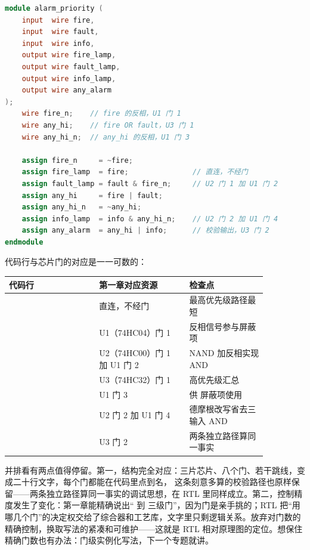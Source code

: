 \begin{lstlisting}[language=Verilog]
module alarm_priority (
    input  wire fire,
    input  wire fault,
    input  wire info,
    output wire fire_lamp,
    output wire fault_lamp,
    output wire info_lamp,
    output wire any_alarm
);
    wire fire_n;    // fire 的反相，U1 门 1
    wire any_hi;    // fire OR fault，U3 门 1
    wire any_hi_n;  // any_hi 的反相，U1 门 3

    assign fire_n     = ~fire;
    assign fire_lamp  = fire;               // 直连，不经门
    assign fault_lamp = fault & fire_n;     // U2 门 1 加 U1 门 2
    assign any_hi     = fire | fault;
    assign any_hi_n   = ~any_hi;
    assign info_lamp  = info & any_hi_n;    // U2 门 2 加 U1 门 4
    assign any_alarm  = any_hi | info;      // 校验输出，U3 门 2
endmodule
\end{lstlisting}

代码行与芯片门的对应是一一可数的：

\begin{longtable}{L{0.3\linewidth}L{0.3\linewidth}L{0.26\linewidth}}
\toprule
代码行 & 第一章对应资源 & 检查点 \\
\midrule
{} & 直连，不经门 & 最高优先级路径最短 \\
 & U1（74HC04）门 1 & 反相信号参与屏蔽项 \\
 & U2（74HC00）门 1 加 U1 门 2 & NAND 加反相实现 AND \\
 & U3（74HC32）门 1 & 高优先级汇总 \\
 & U1 门 3 & 供  屏蔽项使用 \\
 & U2 门 2 加 U1 门 4 & 德摩根改写省去三输入 AND \\
 & U3 门 2 & 两条独立路径算同一事实 \\
\bottomrule
\end{longtable}

并排看有两点值得停留。第一，结构完全对应：三片芯片、八个门、若干跳线，变成二十行文字，每个门都能在代码里点到名， 这条刻意多算的校验路径也原样保留——两条独立路径算同一事实的调试思想，在 RTL 里同样成立。第二，控制精度发生了变化：第一章能精确说出“ 到  三级门”，因为门是亲手挑的；RTL 把“用哪几个门”的决定权交给了综合器和工艺库，文字里只剩逻辑关系。放弃对门数的精确控制，换取写法的紧凑和可维护——这就是 RTL 相对原理图的定位。想保住精确门数也有办法：门级实例化写法，下一个专题就讲。

